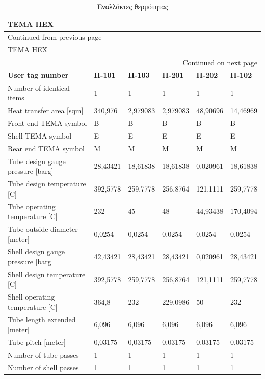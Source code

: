 \documentclass[11pt]{article}
\begin{document}
\begin{longtable}{llllll}
\caption{Eναλλάκτες θερμότητας}
\\
TEMA HEX &  &  &  &  & \\
\hline
\endfirsthead
\multicolumn{6}{l}{Continued from previous page} \\
\hline

TEMA HEX &  &  &  &  &  \\

\hline
\endhead
\hline\multicolumn{6}{r}{Continued on next page} \\
\endfoot
\endlastfoot
\hline
\textbf{User tag number} & \textbf{H-101} & \textbf{H-103} & \textbf{H-201} & \textbf{H-202} & \textbf{H-102}\\
Number of identical items & 1 & 1 & 1 & 1 & 1\\
Heat transfer area [sqm] & 340,976 & 2,979083 & 2,979083 & 48,90696 & 14,46969\\
Front end TEMA symbol & B & B & B & B & B\\
Shell TEMA symbol & E & E & E & E & E\\
Rear end TEMA symbol & M & M & M & M & M\\
Tube design gauge pressure [barg] & 28,43421 & 18,61838 & 18,61838 & 0,020961 & 18,61838\\
Tube design temperature [C] & 392,5778 & 259,7778 & 256,8764 & 121,1111 & 259,7778\\
Tube operating temperature [C] & 232 & 45 & 48 & 44,93438 & 170,4094\\
Tube outside diameter [meter] & 0,0254 & 0,0254 & 0,0254 & 0,0254 & 0,0254\\
Shell design gauge pressure [barg] & 42,43421 & 28,43421 & 28,43421 & 0,020961 & 28,43421\\
Shell design temperature [C] & 392,5778 & 259,7778 & 256,8764 & 121,1111 & 259,7778\\
Shell operating temperature [C] & 364,8 & 232 & 229,0986 & 50 & 232\\
Tube length extended [meter] & 6,096 & 6,096 & 6,096 & 6,096 & 6,096\\
Tube pitch [meter] & 0,03175 & 0,03175 & 0,03175 & 0,03175 & 0,03175\\
Number of tube passes & 1 & 1 & 1 & 1 & 1\\
Number of shell passes & 1 & 1 & 1 & 1 & 1\\
\end{longtable}
\end{document}
